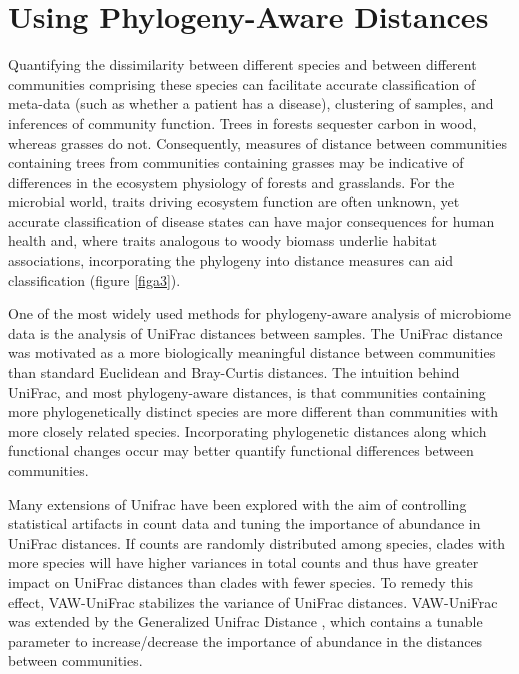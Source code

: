 \section{Using Phylogeny-Aware Distances }
Quantifying the dissimilarity between different species and between different communities comprising these species can facilitate accurate classification of meta-data (such as whether a patient has a disease), clustering of samples, and inferences of community function. Trees in forests sequester carbon in wood, whereas grasses do not. Consequently, measures of distance between communities containing trees from communities containing grasses may be indicative of differences in the ecosystem physiology of forests and grasslands. For the microbial world, traits driving ecosystem function are often unknown, yet accurate classification of disease states can have major consequences for human health and, where traits analogous to woody biomass underlie habitat associations, incorporating the phylogeny into distance measures can aid classification (figure \ref{figa3}). \par
One of the most widely used methods for phylogeny-aware analysis of microbiome data is the analysis of UniFrac distances between samples\cite{unifrac}. The UniFrac distance was motivated as a more biologically meaningful distance between communities than standard Euclidean and Bray-Curtis distances. The intuition behind UniFrac, and most phylogeny-aware distances, is that communities containing more phylogenetically distinct species are more different than communities with more closely related species. Incorporating phylogenetic distances along which functional changes occur may better quantify functional differences between communities.\par
Many extensions of Unifrac have been explored with the aim of controlling statistical artifacts in count data and tuning the importance of abundance in UniFrac distances. If counts are randomly distributed among species, clades with more species will have higher variances in total counts and thus have greater impact on UniFrac distances than clades with fewer species. To remedy this effect, VAW-UniFrac\cite{vaw_unifrac} stabilizes the variance of UniFrac distances. VAW-UniFrac was extended by the Generalized Unifrac Distance \cite{generalized_unifrac}, which contains a tunable parameter to increase/decrease the importance of abundance in the distances between communities. \par
